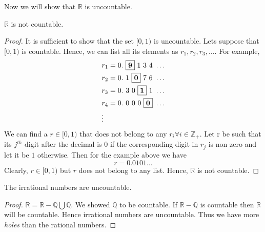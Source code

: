 Now we will 
show that $\mathbb{R}$ is uncountable.
\begin{Theorem}[name=Uncountability of $\mathbb{R}$]
    $\mathbb{R}$ is not countable.
\end{Theorem}
\begin{proof}
    It is sufficient to show that the set $[0,1)$ is uncountable.
    Lets suppose that $[0,1)$ is countable. Hence, we can list all its elements as $r_1, r_2, r_3,
    \ldots$. For example,  
    \begin{displaymath}
	\begin{aligned}
	    & r_1 = 0.\ \fbox{$\mathbf{9}$} \ 1 \ 3 \ 4 \ \ldots \\
	    & r_2 = 0.\ 1 \ \fbox{$\mathbf{0}$} \ 7 \ 6 \  \ldots \\
	    & r_3 = 0.\ 3 \ 0 \ \fbox{$\mathbf{1}$} \ 1 \  \ldots \\
	    & r_4 = 0.\ 0 \ 0 \ 0 \ \fbox{$\mathbf{0}$} \ \ldots \\
	    & \vdots
	\end{aligned}
    \end{displaymath}
    We can find a $r \in [0,1)$ that does not belong to any $r_i \forall i \in \mathbb{Z}_+$.
    Let r be such that its $j^{th}$ digit after the decimal is $0$ if the corresponding digit in
    $r_j$ is non zero and let it be $1$ otherwise. Then for the example above we have 
    \begin{displaymath}
	r = 0.0101\ldots
    \end{displaymath}	
    Clearly, $r \in [0,1)$ but $r$ does not belong to any list. Hence, $\mathbb{R}$ is not
    countable. 
\end{proof}
\begin{Corollary}
    The irrational numbers are uncountable.
\end{Corollary}
\begin{proof}
    $\mathbb{R} = \mathbb{R} - \mathbb{Q} \bigcup \mathbb{Q}$. We showed $\mathbb{Q}$ to be
    countable. If $\mathbb{R} - \mathbb{Q}$ is countable then $\mathbb{R}$ will be countable.
    Hence irrational numbers are uncountable. Thus we have more \emph{holes} than the rational
    numbers.
\end{proof}




